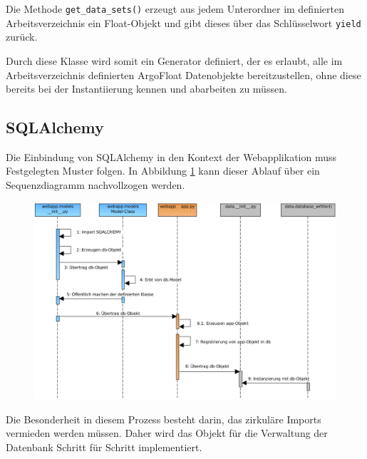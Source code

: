 Die Methode \texttt{get\_data\_sets()} erzeugt aus jedem Unterordner im definierten Arbeitsverzeichnis ein Float-Objekt und gibt dieses über das Schlüsselwort \texttt{yield} zurück. 

Durch diese Klasse wird somit ein Generator definiert, der es erlaubt, alle im Arbeitsverzeichnis definierten ArgoFloat Datenobjekte bereitzustellen, ohne diese bereits bei der Instantiierung kennen und abarbeiten zu müssen.




\subsection{SQLAlchemy}

Die Einbindung von SQLAlchemy in den Kontext der Webapplikation muss Festgelegten Muster folgen. In Abbildung \ref{fig:sequenzSQLALCHEMY} kann dieser Ablauf über ein Sequenzdiagramm nachvollzogen werden.

\begin{figure}[!h]
 \centering
 \includegraphics[width=\textwidth]{pix/seq_db.png}
 \label{fig:sequenzSQLALCHEMY}
\end{figure}

Die Besonderheit in diesem Prozess besteht darin, das zirkuläre Imports vermieden werden müssen. Daher wird das Objekt für die Verwaltung der Datenbank Schritt für Schritt implementiert.


